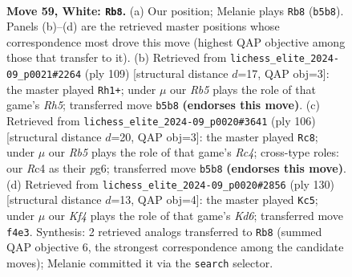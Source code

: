 \documentclass[11pt]{article}
\begin{document}
\clearpage

\begin{figure}[p]\centering
\begin{subfigure}{0.46\textwidth}\centering
\resizebox{\linewidth}{!}{%
\newchessgame
\chessboard[
  setfen={8/5p2/4pk2/1R6/P1R1PK2/5P2/7r/8 w - - 9 59},
  showmover=false,
  pgfstyle=straightmove, color=movearrow, markmove={b5-b8}
]}
\caption{}
\end{subfigure}\hfill
\begin{subfigure}{0.46\textwidth}\centering
\resizebox{\linewidth}{!}{%
\newchessgame
\chessboard[
  setfen={R7/8/5p2/5kp1/4p2r/4P3/5P2/5K2 b - - 11 55},
  showmover=false,
  pgfstyle=straightmove, color=movearrow, markmove={h4-h1}
]}
\caption{}
\end{subfigure}
\\[4pt]
\begin{subfigure}{0.46\textwidth}\centering
\resizebox{\linewidth}{!}{%
\newchessgame
\chessboard[
  setfen={8/8/1r3kp1/7p/2R4P/5PK1/6P1/8 w - - 4 54},
  showmover=false,
  pgfstyle=straightmove, color=movearrow, markmove={c4-c8}
]}
\caption{}
\end{subfigure}\hfill
\begin{subfigure}{0.46\textwidth}\centering
\resizebox{\linewidth}{!}{%
\newchessgame
\chessboard[
  setfen={8/5kp1/3K2p1/3PR1P1/5P2/r7/8/8 w - - 21 66},
  showmover=false,
  pgfstyle=straightmove, color=movearrow, markmove={d6-c5}
]}
\caption{}
\end{subfigure}
\caption{\textbf{Move 59, White: \texttt{Rb8}.} (a) Our position; Melanie plays \texttt{Rb8} (\texttt{b5b8}). Panels (b)--(d) are the retrieved master positions whose correspondence most drove this move (highest QAP objective among those that transfer to it). (b) Retrieved from \texttt{lichess\_elite\_2024-09\_p0021\#2264} (ply 109) [structural distance $d$=17, QAP obj=3]: the master played \texttt{Rh1+}; under $\mu$ our \emph{Rb5} plays the role of that game's \emph{Rh5}; transferred move \texttt{b5b8} \textbf{(endorses this move)}. (c) Retrieved from \texttt{lichess\_elite\_2024-09\_p0020\#3641} (ply 106) [structural distance $d$=20, QAP obj=3]: the master played \texttt{Rc8}; under $\mu$ our \emph{Rb5} plays the role of that game's \emph{Rc4}; cross-type roles: our \emph{R}c4 as their \emph{p}g6; transferred move \texttt{b5b8} \textbf{(endorses this move)}. (d) Retrieved from \texttt{lichess\_elite\_2024-09\_p0020\#2856} (ply 130) [structural distance $d$=13, QAP obj=4]: the master played \texttt{Kc5}; under $\mu$ our \emph{Kf4} plays the role of that game's \emph{Kd6}; transferred move \texttt{f4e3}. Synthesis: 2 retrieved analogs transferred to \texttt{Rb8} (summed QAP objective 6, the strongest correspondence among the candidate moves); Melanie committed it via the \texttt{search} selector.}
\label{fig:thought-m116}
\end{figure}
\end{document}
